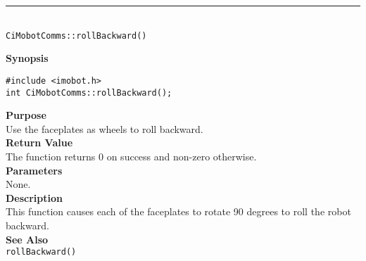 \noindent
\vspace{5pt}
\rule{4.5in}{0.015in}\\
\noindent
{\LARGE \texttt{CiMobotComms::rollBackward()}}\\
{}

\noindent
{\bf Synopsis}\\
\begin{verbatim}
#include <imobot.h>
int CiMobotComms::rollBackward();
\end{verbatim}

\noindent
{\bf Purpose}\\
Use the faceplates as wheels to roll backward.\\

\noindent
{\bf Return Value}\\
The function returns 0 on success and non-zero otherwise.\\

\noindent
{\bf Parameters}\\
None.\\

\noindent
{\bf Description}\\
This function causes each of the faceplates to rotate 90 degrees to roll the
robot backward.\\

\noindent
{\bf See Also}\\
\texttt{rollBackward()}

